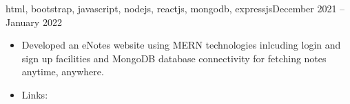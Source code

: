 \documentclass[10pt,a4paper]{altacv}
\begin{document}
{\MakeLowercase{HTML, Bootstrap, javascript, nodejs, ReactJS, mongoDB, expressjs}}{December 2021 -- January 2022}{}
\begin{itemize}
\item Developed an eNotes website using MERN technologies inlcuding login and sign up facilities and MongoDB database connectivity for fetching notes anytime, anywhere.
\item Links: 
\end{itemize}
\divider




\begin{comment}

\cvevent{Native Speech Recognition}{}{}{}
\begin{itemize}
    \item Develop a Recommendation system which shows three kinds of recommendations based on the popularity of the genre,content
\end{itemize}
\medskip
\divider


\cvevent{ChatBot}{}{}{}
\begin{itemize}
\item Develop a Recommendation system which shows three kinds of recommendations based on the popularity of the genre,content
\end{itemize}
\medskip
\divider

\cvevent{Quiz Game}{}{}{}
\begin{itemize}
\item Develop a Recommendation system which shows three kinds of recommendations based on the popularity of the genre,content
\end{itemize}
\medskip
\divider

\cvevent{Whatsapp Broadcast}{}{}{}
\begin{itemize}
\item Develop a Recommendation system which shows three kinds of recommendations based on the popularity of the genre,content
\end{itemize}
\medskip
\divider
\end{comment}



\clearpage




\end{document}
